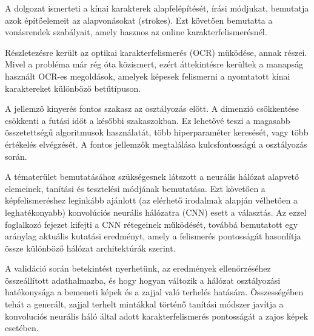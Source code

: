 
A dolgozat ismerteti a kínai karakterek alapfelépítését, írási módjukat, bemutatja azok építőelemeit az alapvonásokat (strokes). Ezt követően bemutatta a vonásrendek szabályait, amely hasznos az online karakterfelismerésnél.

Részletezésre került az optikai karakterfelismerés (OCR) müködése, annak részei. Mivel a probléma már rég óta közismert, ezért áttekintésre kerültek a manapság használt OCR-es megoldások, amelyek képesek felismerni a nyomtatott kínai karaktereket különböző betűtípuson.

A jellemző kinyerés fontos szakasz az osztályozás elött. A dimenzió csökkentése csökkenti a futási időt a későbbi szakaszokban. Ez lehetővé teszi a magasabb összetettségű algoritmusok használatát, több hiperparaméter keresését, vagy több értékelés elvégzését. A fontos jellemzők megtalálása kulcsfontosságú a osztályozás során.

A tématerület bemutatásához szükségesnek látszott a neurális hálózat alapvető elemeinek, tanítási és tesztelési módjának bemutatása. Ezt követően a képfelismeréshez leginkább ajánlott (az elérhető irodalmak alapján vélhetően a leghatékonyabb) konvolúciós neurális hálózatra (CNN) esett a választás. Az ezzel foglalkozó fejezet kifejti a CNN rétegeinek működését, továbbá bemutatott egy aránylag aktuális kutatási eredményt, amely a felismerés pontosságát hasonlítja össze különböző hálózat architektúrák szerint.

A validáció során betekintést nyerhetünk, az eredmények ellenőrzéséhez összeállított adathalmazba, és hogy hogyan változik a hálózat osztályozási hatékonysága a bemeneti képek és a zajjal való terhelés hatására. Összességében tehát a generált, zajjal terhelt mintákkal történő tanítási módszer javítja a konvoluciós neurális háló által adott karakterfelismerés pontosságát a zajos képek esetében.
